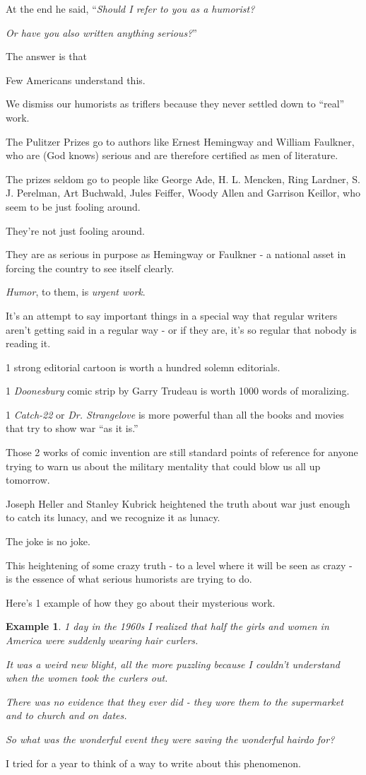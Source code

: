 \documentclass{book}
\numberwithin{equation}{section}
\newtheorem{example}{Example}[chapter]
\begin{document}
At the end he said, ``\textit{Should I refer to you as a humorist?}

\textit{Or have you also written anything serious?}''

%
The answer is that 

Few Americans understand this.

We dismiss our humorists as triflers because they never settled down to ``real'' work.

The Pulitzer Prizes go to authors like Ernest Hemingway and William Faulkner, who are (God knows) serious and are therefore certified as men of literature.

The prizes seldom go to people like George Ade, H. L. Mencken, Ring Lardner, S. J. Perelman, Art Buchwald, Jules Feiffer, Woody Allen and Garrison Keillor, who seem to be just fooling around.

%
They're not just fooling around.

They are as serious in purpose as Hemingway or Faulkner - a national asset in forcing the country to see itself clearly.

\textit{Humor}, to them, is \textit{urgent work}.

It's an attempt to say important things in a special way that regular writers aren't getting said in a regular way - or if they are, it's so regular that nobody is reading it.

%
1 strong editorial cartoon is worth a hundred solemn editorials.

1 \textit{Doonesbury} comic strip by Garry Trudeau is worth 1000 words of moralizing.

1 \textit{Catch-22} or \textit{Dr. Strangelove} is more powerful than all the books and movies that try to show war ``as it is.''

Those 2 works of comic invention are still standard points of reference for anyone trying to warn us about the military mentality that could blow us all up tomorrow.

Joseph Heller and Stanley Kubrick heightened the truth about war just enough to catch its lunacy, and we recognize it as lunacy.

The joke is no joke.

%
This heightening of some crazy truth - to a level where it will be seen as crazy - is the essence of what serious humorists are trying to do.

Here's 1 example of how they go about their mysterious work.
\begin{example}
    1 day in the 1960s I realized that half the girls and women in America were suddenly wearing hair curlers.
    
    It was a weird new blight, all the more puzzling because I couldn't understand when the women took the curlers out.
    
    There was no evidence that they ever did - they wore them to the supermarket and to church and on dates.
    
    So what was the wonderful event they were saving the wonderful hairdo for?
\end{example}
I tried for a year to think of a way to write about this phenomenon.
\end{document}
